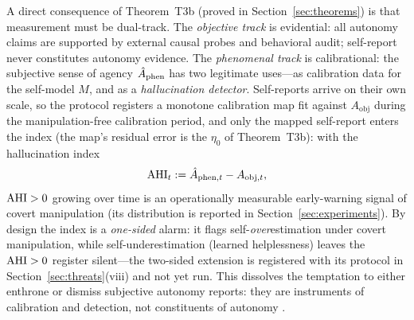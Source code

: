 A direct consequence of Theorem~T3b (proved in Section~\ref{sec:theorems}) is
that measurement must be dual-track. The \emph{objective track} is
evidential: all autonomy claims are supported by external causal probes and
behavioral audit; self-report never constitutes autonomy evidence. The
\emph{phenomenal track} is calibrational: the subjective sense of agency
$\hat{A}_{\mathrm{phen}}$ has two legitimate uses---as calibration data for the self-model $M$,
and as a \emph{hallucination detector}. Self-reports arrive on their own
scale, so the protocol registers a monotone calibration map fit against
$A_{\mathrm{obj}}$ during the manipulation-free calibration period, and only
the mapped self-report enters the index (the map's residual error is the
$\eta_0$ of Theorem~T3b): with the hallucination index
\begin{equation}\label{eq:ai}
\mathrm{AHI}_t := \hat{A}_{\mathrm{phen},t} - A_{\mathrm{obj},t},
\end{equation}
$\mathrm{AHI}>0$ growing over time is an operationally measurable early-warning signal
of covert manipulation (its distribution is reported in
Section~\ref{sec:experiments}). By design the index is a \emph{one-sided}
alarm: it flags self-\emph{over}estimation under covert manipulation, while
self-underestimation (learned helplessness) leaves the $\mathrm{AHI}>0$ register
silent---the two-sided extension is registered with its protocol in
Section~\ref{sec:threats}(viii) and not yet run. This dissolves the temptation to either
enthrone or dismiss subjective autonomy reports: they are instruments of
calibration and detection, not constituents of autonomy
\citep{moore_obhi2012,sharma2023}.
